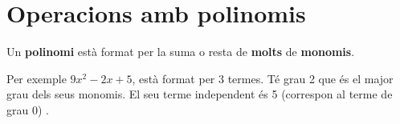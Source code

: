 \section{Operacions amb polinomis}

\begin{theorybox}
\begin{multicols}{2}
	\centering
 \end{multicols}

 Un \textbf{polinomi} està format per la suma o resta de \textbf{molts} de \textbf{monomis}. 
 
 Per exemple $9x^2-2x+5$, està format per 3 termes. Té grau 2 que és el major grau dels seus monomis. El seu terme independent és 5 (correspon al terme de grau 0) .
\end{theorybox}

